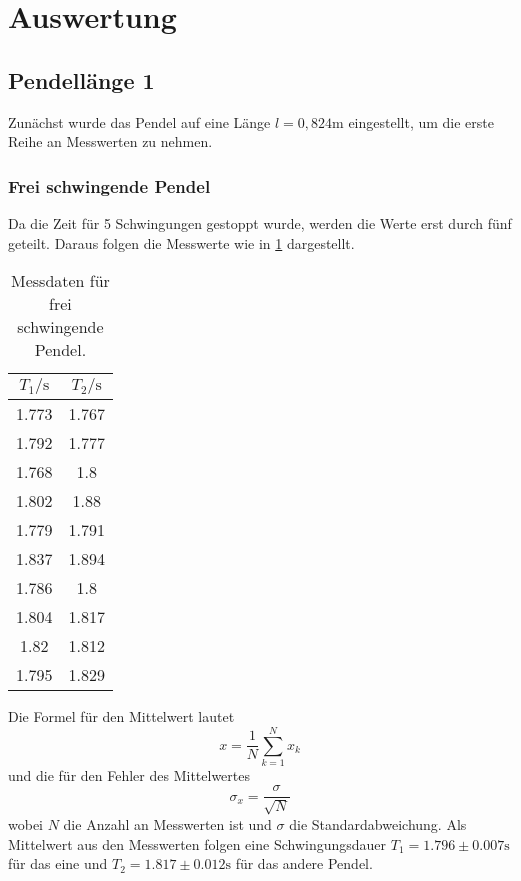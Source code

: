 \section{Auswertung}
\subsection{Pendellänge 1}
Zunächst wurde das Pendel auf eine Länge $l = 0,824 \si{\m}$ eingestellt, um die erste Reihe an Messwerten zu nehmen.

\subsubsection{Frei schwingende Pendel}
Da die Zeit für 5 Schwingungen gestoppt wurde, werden die
Werte erst durch fünf geteilt. Daraus folgen die Messwerte
wie in \ref{tab:frei} dargestellt.
\begin{table}
    \centering
    \caption{Messdaten für frei schwingende Pendel.}
    \label{tab:frei}
    \begin{tabular}{c c}
     \toprule
     $T_1 / \si{\s}$ & $T_2 / \si{\s}$\\
     \midrule
     1.773 & 1.767 \\
     1.792 & 1.777 \\
     1.768 & 1.8 \\
     1.802 & 1.88\\
     1.779 & 1.791\\
     1.837 & 1.894\\
     1.786 & 1.8 \\
     1.804 & 1.817\\
     1.82 & 1.812 \\
     1.795 & 1.829 \\
     \bottomrule
    \end{tabular}
\end{table}
Die Formel für den Mittelwert lautet
\begin{equation}
x = \frac{1}{N} \sum_{k=1}^{N} x_k
\label{eqn:mittel}
\end{equation}
und die für den Fehler des Mittelwertes
\begin{equation}
\sigma_{x} = \frac{\sigma}{\sqrt{N}}
\label{eqn:mif}
\end{equation}
wobei $N$ die Anzahl an Messwerten ist und $\sigma$ die Standardabweichung.
Als Mittelwert aus den Messwerten folgen eine
Schwingungsdauer $T_1 = 1.796\pm 0.007 \si{\s}$ für das eine und 
$T_2 = 1.817\pm 0.012 \si{\s}$ für das andere Pendel.


